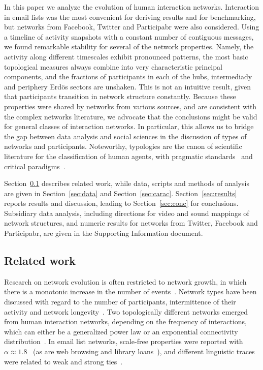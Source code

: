 \documentclass[%
	aip,
	jmp,%
	amsmath,amssymb,
	reprint,%
]{revtex4-1}
\begin{document}
In this paper we analyze the evolution of human interaction networks.
Interaction in email lists was the most convenient for deriving results and for benchmarking,
but networks from Facebook, Twitter and Participabr were also considered.
Using a timeline of activity snapshots with a constant number of contiguous messages,
we found remarkable stability for several of the network properties.
Namely, the activity along different timescales exhibit pronounced patterns,
the most basic topological measures always combine into very characteristic principal components,
and the fractions of participants in each of the hubs, intermediady and periphery Erd\"os sectors
are unshaken.
This is not an intuitive result, given that participants transition in network structure constantly.
Because these properties were shared by networks from various sources,
and are consistent with the complex networks literature,
we advocate that the conclusions might be valid for general classes of interaction networks.
In particular, this allows us to 
bridge the gap between data analysis 
and social sciences in the discussion
of types of networks and participants.
Noteworthy, typologies are the canon of scientific literature for the classification of human agents,
with pragmatic standards~\cite{myers} and critical paradigms~\cite{adorno,typCanon}. 

Section~\ref{sec:related} describes related work,
while data, scripts and methods of analysis are given in Section~\ref{sec:data} and Section~\ref{sec:carac}.
Section~\ref{sec:results} reports results and discussion, leading to Section~\ref{sec:conc} for conclusions.
Subsidiary data analysis,
including directions for video and sound mappings of network structures,
and numeric results for networks from Twitter, Facebook and Participabr,
are given in the Supporting Information document.


\subsection{Related work}\label{sec:related}
Research on network evolution is often restricted to network growth, in which there is a monotonic increase in the number of events~\cite{barabasiEvo}.
Network types have been discussed with regard to the number of participants, intermittence of their activity and network longevity~\cite{barabasiEvo}. Two topologically different networks emerged from human interaction networks, depending on the frequency of interactions, which can either be a generalized power law or an exponential connectivity distribution~\cite{barabasiTopologicalEv}. In email list networks, scale-free properties were reported with $\alpha \approx 1.8$~\cite{bird} (as are web browsing and library loans~\cite{barabasiHumanDyn}), and different linguistic traces were related to weak and strong ties~\cite{GMANE2}.
\end{document}
